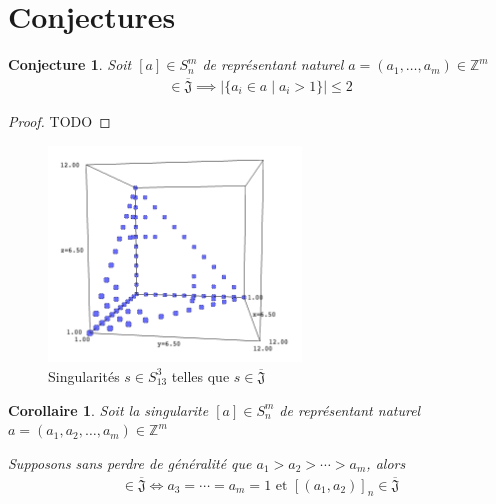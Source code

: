 \documentclass{article}
\newtheorem{conjecture}{Conjecture}
\newtheorem{corollary}{Corollaire}
\begin{document}
\newpage

\section{Conjectures}

\begin{conjecture}
    Soit $[a] \in S_n^m$ de représentant naturel $a = (a_1, \dots, a_m) \in \mathbb{Z}^m$
    \begin{align*}
        [a] \in \overline{\mathfrak{J}} \implies |\{ a_i \in a \mid a_i > 1 \}| \leq 2
    \end{align*}
\end{conjecture}

\begin{proof}
    TODO
\end{proof}

\begin{figure}[h]
    \caption{Singularités $s \in S_{13}^3$ telles que $s \in \overline{\mathfrak{J}}$}
    \centering
    \includegraphics[width=0.6\textwidth]{singularite_j_strict_m3_n13}
\end{figure}

\begin{corollary}
    Soit la singularite $[a] \in S_n^m$ de représentant naturel $a = (a_1, a_2, \dots, a_m) \in \mathbb{Z}^m$

    Supposons sans perdre de généralité que $a_1 > a_2 > \cdots > a_m$, alors
    \begin{align*}
        [a] \in \overline{\mathfrak{J}} \iff a_3 = \cdots = a_m = 1 \text{ et } {[(a_1, a_2)]}_n \in \overline{\mathfrak{J}}
    \end{align*}
\end{corollary}
\end{document}
